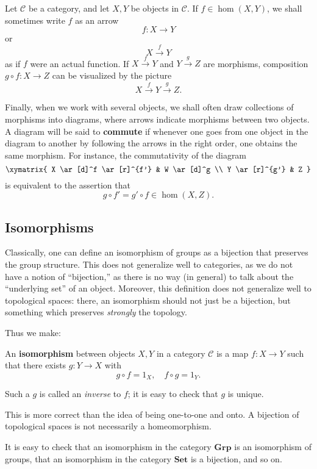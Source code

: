 Let $\mathcal{C}$ be a category, and let $X, Y$ be objects in $\mathcal{C}$.
If $f \in \hom(X, Y)$, we shall sometimes write $f$ as an arrow
\[ f: X \to Y  \]
or
\[ X \stackrel{f}{\to} Y \]
as if $f$ were an actual function.
If $X \stackrel{f}{\to} Y$ and $Y \stackrel{g}{\to} Z$ are morphisms,
composition $g \circ f: X \to Z$ can be visualized by the picture
\[ X \stackrel{f}{\to} Y \stackrel{g}{\to} Z.\]

Finally, when we work with several objects, we shall often draw collections of
morphisms into diagrams, where arrows indicate morphisms between two objects.
A diagram will be said to \textbf{commute} if whenever one goes from one
object in the diagram to another by following the arrows in the right order,
one obtains the same morphism.
For instance, the commutativity of the diagram
\[ \xymatrix{
X \ar[d]^f \ar[r]^{f'} &  W \ar[d]^g \\
Y \ar[r]^{g'} &  Z
}\]
is equivalent to the assertion that
\[ g \circ f' = g' \circ f \in \hom(X, Z).  \]


\subsection{Isomorphisms}

Classically, one can define an isomorphism of groups as a bijection that
preserves the group structure. This does not generalize well to categories, as
we do not have a notion of ``bijection,'' as there is no way (in general) to
talk about the ``underlying set'' of an object.
Moreover, this definition does not generalize well to topological spaces:
there, an isomorphism should not just be a bijection, but something which
preserves \emph{strongly} the topology.


Thus we make:

\begin{definition}
An \textbf{isomorphism} between objects $X, Y$ in a category $\mathcal{C}$ is a
map $f: X \to Y$ such that there exists $g: Y \to X$ with
\[ g \circ f = 1_X, \quad f \circ g = 1_Y.  \]

Such a $g$ is called an \emph{inverse} to $f$; it is easy to check that $g$ is
unique.
\end{definition}

This is more correct than the idea of being one-to-one and onto. A bijection of
topological spaces is not necessarily a homeomorphism.


\begin{example} 
It is easy to check that an isomorphism in the category $\mathbf{Grp}$ is an
isomorphism of groups, that an isomorphism in the category $\mathbf{Set}$ is a
bijection, and so on. 
\end{example} 

